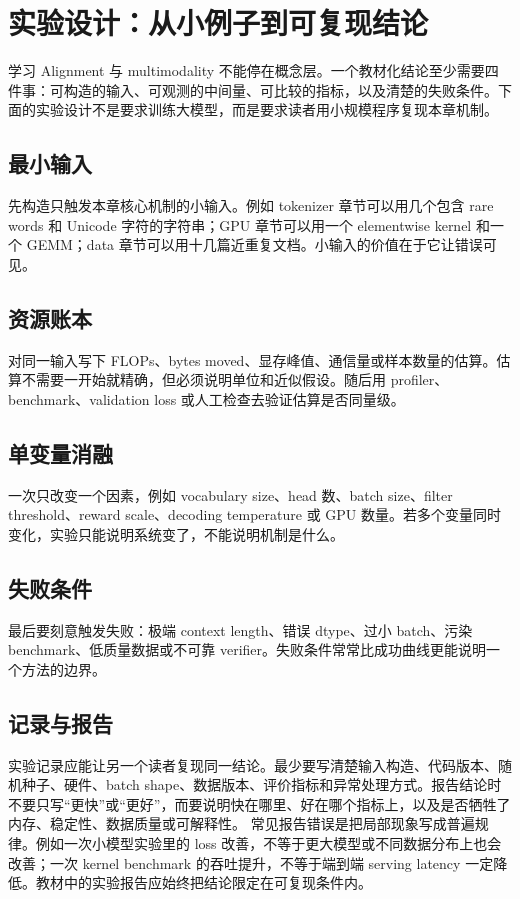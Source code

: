 \documentclass[a4paper]{article}
\begin{document}
\section{实验设计：从小例子到可复现结论}
学习 Alignment 与 multimodality 不能停在概念层。一个教材化结论至少需要四件事：可构造的输入、可观测的中间量、可比较的指标，以及清楚的失败条件。下面的实验设计不是要求训练大模型，而是要求读者用小规模程序复现本章机制。
\subsection{最小输入}
先构造只触发本章核心机制的小输入。例如 tokenizer 章节可以用几个包含 rare words 和 Unicode 字符的字符串；GPU 章节可以用一个 elementwise kernel 和一个 GEMM；data 章节可以用十几篇近重复文档。小输入的价值在于它让错误可见。
\subsection{资源账本}
对同一输入写下 FLOPs、bytes moved、显存峰值、通信量或样本数量的估算。估算不需要一开始就精确，但必须说明单位和近似假设。随后用 profiler、benchmark、validation loss 或人工检查去验证估算是否同量级。
\subsection{单变量消融}
一次只改变一个因素，例如 vocabulary size、head 数、batch size、filter threshold、reward scale、decoding temperature 或 GPU 数量。若多个变量同时变化，实验只能说明系统变了，不能说明机制是什么。
\subsection{失败条件}
最后要刻意触发失败：极端 context length、错误 dtype、过小 batch、污染 benchmark、低质量数据或不可靠 verifier。失败条件常常比成功曲线更能说明一个方法的边界。
\subsection{记录与报告}
实验记录应能让另一个读者复现同一结论。最少要写清楚输入构造、代码版本、随机种子、硬件、batch shape、数据版本、评价指标和异常处理方式。报告结论时不要只写“更快”或“更好”，而要说明快在哪里、好在哪个指标上，以及是否牺牲了内存、稳定性、数据质量或可解释性。
常见报告错误是把局部现象写成普遍规律。例如一次小模型实验里的 loss 改善，不等于更大模型或不同数据分布上也会改善；一次 kernel benchmark 的吞吐提升，不等于端到端 serving latency 一定降低。教材中的实验报告应始终把结论限定在可复现条件内。
\end{document}
